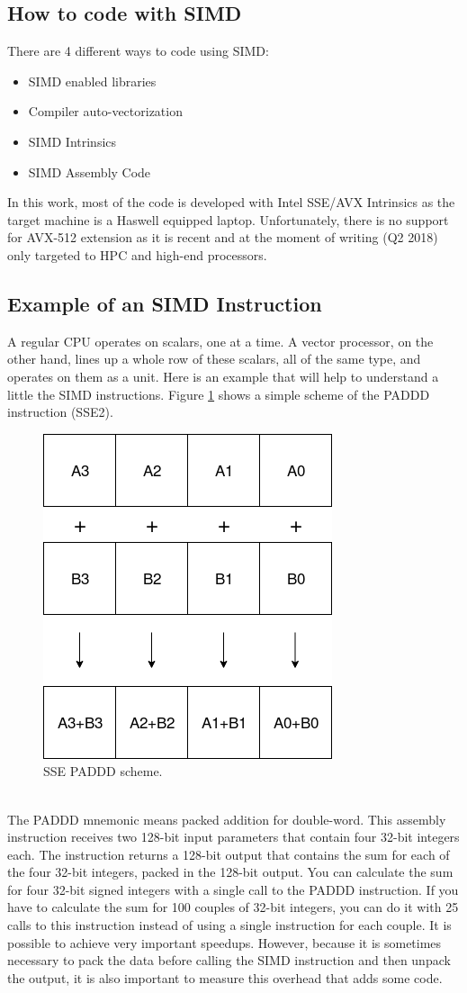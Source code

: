 \documentclass[a4paper]{article}
\begin{document}
\subsection{How to code with SIMD}
There are 4 different ways to code using SIMD:
\begin{itemize}
	\item SIMD enabled libraries
	\item Compiler auto-vectorization
	\item SIMD Intrinsics
	\item SIMD Assembly Code
\end{itemize}
In this work, most of the code is developed with Intel SSE/AVX Intrinsics as the target machine is a Haswell equipped laptop. Unfortunately, there is no support for AVX-512 extension as it is recent and at the moment of writing (Q2 2018) only targeted to HPC and high-end processors.

\subsection{Example of an SIMD Instruction}
A regular CPU operates on scalars, one at a time. A vector processor, on the other hand, lines up a whole row of these scalars, all of the same type, and operates on them as a unit. Here is an example that will help to understand a little the SIMD instructions. Figure \ref{fig:PADD} shows a simple scheme of the PADDD instruction (SSE2).
\begin{figure}[h]
	\centering
	\includegraphics[width=.4\linewidth]{sse_add.png}
	\caption{SSE PADDD scheme.}
	\label{fig:PADD}
\end{figure}
\\The PADDD mnemonic means packed addition for double-word. This assembly instruction receives two 128-bit input parameters that contain four 32-bit integers each. The instruction returns a 128-bit output that contains the sum for each of the four 32-bit integers, packed in the 128-bit output. You can calculate the sum for four 32-bit signed integers with a single call to the PADDD instruction. If you have to calculate the sum for 100 couples of 32-bit integers, you can do it with 25 calls to this instruction instead of using a single instruction for each couple. It is possible to achieve very important speedups. However, because it is sometimes necessary to pack the data before calling the SIMD instruction and then unpack the output, it is also important to measure this overhead that adds some code.
\end{document}
